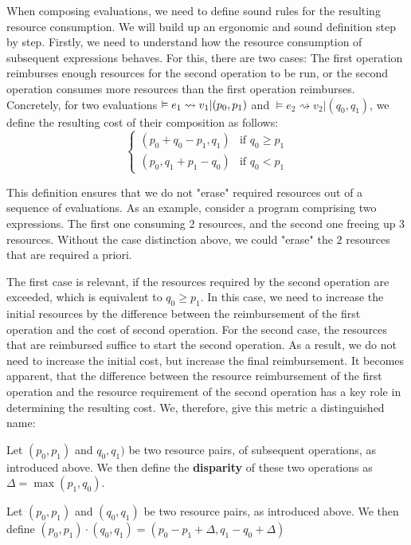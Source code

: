 When composing evaluations, we need to define sound rules for the resulting resource consumption. We will build up an ergonomic and sound definition step by step. Firstly, we need to understand how the resource consumption of subsequent expressions behaves. For this, there are two cases: The first operation reimburses enough resources for the second operation to be run, or the second operation consumes more resources than the first operation reimburses. Concretely, for two evaluations \( \vDash e_1 \rightsquigarrow v_1 | (p_0, p_1)\) and \( \vDash e_2 \rightsquigarrow v_2 | (q_0, q_1)\), we define the resulting cost of their composition as follows:
\[
   \begin{cases}
      (p_0 + q_0 - p_1, q_1) & \mbox{if } q_0 \geq p_1 \\
      (p_0, q_1 + p_1 - q_0) & \mbox{if } q_0 <    p_1
   \end{cases}
\]

This definition ensures that we do not "erase" required resources out of a sequence of evaluations. As an example, consider a program comprising two expressions. The first one consuming 2 resources, and the second one freeing up 3 resources. Without the case distinction above, we could "erase" the \(2\) resources that are required a priori. 

The first case is relevant, if the resources required by the second operation are exceeded, which is equivalent to \(q_0 \geq p_1\). In this case, we need to increase the initial resources by the difference between the reimbursement of the first operation and the cost of second operation. For the second case, the resources that are reimbursed suffice to start the second operation. As a result, we do not need to increase the initial cost, but increase the final reimbursement. It becomes apparent, that the difference between the resource reimbursement of the first operation and the resource requirement of the second operation has a key role in determining the resulting cost. We, therefore, give this metric a distinguished name:

\begin{definition}
   Let \((p_0, p_1)\) and \(q_0, q_1)\) be two resource pairs, of subsequent operations, as introduced above. We then define the \textbf{disparity} of these two operations as \(\Delta = \max(p_1, q_0)\).
\end{definition}


\begin{definition}

   Let \((p_0, p_1)\) and \((q_0, q_1)\) be two resource pairs, as introduced above. We then define 
   \((p_0, p_1) \cdot (q_0, q_1) = (p_0 - p_1 + \Delta, q_1 - q_0 + \Delta)\)
   
\end{definition}

